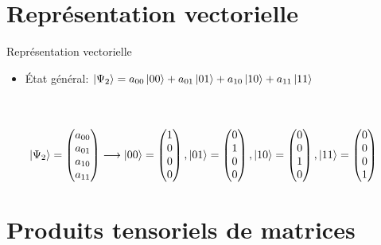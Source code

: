 \documentclass[aspectratio=169,12pt]{beamer}
\begin{document}
\section{Représentation vectorielle}

\begin{frame}{Représentation vectorielle}
  \begin{itemize}
    \item État général: $\ket{\Psi_2} = a_{00}\ket{00}+a_{01}\ket{01}+a_{10}\ket{10}+a_{11}\ket{11}$
  \end{itemize}
  ~\\~\\
  $\qquad \ket{\Psi_2} = \begin{pmatrix} 
    a_{00} \\
    a_{01} \\
    a_{10} \\
    a_{11} \\
\end{pmatrix} \longrightarrow \ket{00} = \begin{pmatrix} 
    1\\
    0\\
    0\\
    0\\
\end{pmatrix} , \ket{01} = \begin{pmatrix} 
    0\\
    1\\
    0\\
    0\\
\end{pmatrix}, \ket{10} = \begin{pmatrix} 
    0\\
    0\\
    1\\
    0\\
\end{pmatrix} , \ket{11} = \begin{pmatrix} 
    0\\
    0\\
    0\\
    1\\
\end{pmatrix}  $
\end{frame}

\section{Produits tensoriels de matrices}
\end{document}
